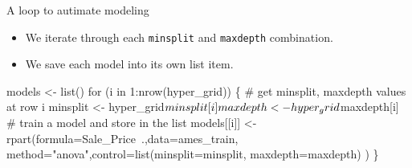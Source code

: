 \documentclass[
  10pt,
  ignorenonframetext,
]{beamer}
\newenvironment{Shaded}{}{}
\newcommand{\CommentTok}[1]{\textcolor[rgb]{0.00,0.50,0.00}{#1}}
\newcommand{\ControlFlowTok}[1]{\textcolor[rgb]{0.00,0.00,1.00}{#1}}
\newcommand{\DataTypeTok}[1]{#1}
\newcommand{\DecValTok}[1]{#1}
\newcommand{\KeywordTok}[1]{\textcolor[rgb]{0.00,0.00,1.00}{#1}}
\newcommand{\NormalTok}[1]{#1}
\newcommand{\OperatorTok}[1]{#1}
\newcommand{\StringTok}[1]{\textcolor[rgb]{0.00,0.50,0.50}{#1}}
\providecommand{\tightlist}{%
  \setlength{\itemsep}{0pt}\setlength{\parskip}{0pt}}
\begin{document}
\begin{frame}[fragile]{A loop to autimate modeling}
\protect\hypertarget{a-loop-to-autimate-modeling}{}

\begin{itemize}
\tightlist
\item
  We iterate through each \texttt{minsplit} and \texttt{maxdepth}
  combination.
\item
  We save each model into its own list item.
\end{itemize}

\begin{Shaded}
\begin{Highlighting}[]
\NormalTok{models <-}\StringTok{ }\KeywordTok{list}\NormalTok{()}
\ControlFlowTok{for}\NormalTok{ (i }\ControlFlowTok{in} \DecValTok{1}\OperatorTok{:}\KeywordTok{nrow}\NormalTok{(hyper_grid)) \{}
  \CommentTok{# get minsplit, maxdepth values at row i}
\NormalTok{  minsplit <-}\StringTok{ }\NormalTok{hyper_grid}\OperatorTok{$}\NormalTok{minsplit[i]}
\NormalTok{  maxdepth <-}\StringTok{ }\NormalTok{hyper_grid}\OperatorTok{$}\NormalTok{maxdepth[i]}
  \CommentTok{# train a model and store in the list}
\NormalTok{  models[[i]] <-}\StringTok{ }\KeywordTok{rpart}\NormalTok{(}\DataTypeTok{formula=}\NormalTok{Sale_Price}\OperatorTok{~}\NormalTok{.,}\DataTypeTok{data=}\NormalTok{ames_train,}
    \DataTypeTok{method=}\StringTok{"anova"}\NormalTok{,}\DataTypeTok{control=}\KeywordTok{list}\NormalTok{(}\DataTypeTok{minsplit=}\NormalTok{minsplit,}
                                \DataTypeTok{maxdepth=}\NormalTok{maxdepth)}
\NormalTok{    )}
\NormalTok{\}}
\end{Highlighting}
\end{Shaded}

\end{frame}
\end{document}

